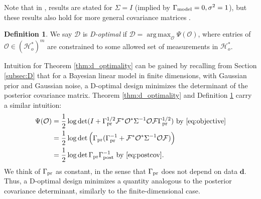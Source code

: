 \documentclass[ba]{imsart}
\newcommand{\hilo}{\mathcal{H}_o}
\newcommand{\obs}{\mathcal{O}}
\newcommand{\fwd}{\mathcal{F}}
\newcommand{\tar}{\Psi}
\DeclareMathOperator*{\argmax}{arg\,max}
\newcommand{\data}{\mathbf{d}}
\newcommand{\opt}{\mathcal{D}}
\theoremstyle{plain}
\theoremstyle{definition}
\newtheorem{definition}[theorem]{Definition}
\theoremstyle{remark}
\begin{document}
Note that in \cite{AlexanderianGloorGhattas14,
  alexanderian2018efficient}, results are stated for \(\Sigma=I\)
(implied by \(\Gamma_{\textup{model}} = 0,\sigma^2=1\)), but these results also hold
for more general covariance matrices
\cite[p. 681]{AlexanderianGloorGhattas14}.

\begin{definition}\label{def:d_optimality}
  We say \(\opt\) is \emph{D-optimal} if \(\opt =
  \argmax_{\obs} \tar(\obs)\), where entries of \(\obs \in (\hilo^*)^m\)
  are constrained to some allowed set of measurements in \(\hilo^*\).
\end{definition}

Intuition for Theorem \ref{thm:d_optimality} can be gained by
recalling from Section \ref{subsec:D} that for a Bayesian linear model
in finite dimensions, with Gaussian prior and Gaussian noise, a
D-optimal design minimizes the determinant of the posterior covariance
matrix. Theorem
\ref{thm:d_optimality} and Definition \ref{def:d_optimality} carry a
similar intuition:
\begin{align*}
  \begin{split}
    \tar(\obs) &= \frac12 \log \det ( I + \prcov^{1/2}  \fwd ^* \obs^* \Sigma^{-1} \obs \fwd \prcov^{1/2}) \text{ by \eqref{eq:objective}}\\
    &= \frac12 \log \det \Big( \prcov ( \prcov^{-1} + \fwd ^* \obs^* \Sigma^{-1} \obs \fwd) \Big )\\
    &= \frac12 \log \det \prcov \postcov^{-1} \text{ by \eqref{eq:postcov}}.
\end{split}
\end{align*}
We think of \(\Gamma_{\textup{pr}}\) as constant, in the sense that $\Gamma_{\textup{pr}}$ does
not depend on data $\data$. Thus, a D-optimal design minimizes a
quantity analogous to the posterior covariance determinant, similarly
to the finite-dimensional case.
\end{document}

